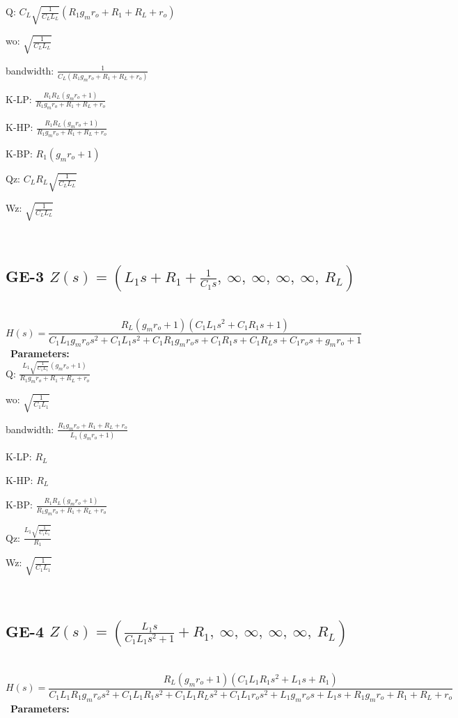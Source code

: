\documentclass{article}
\begin{document}
Q: $C_{L} \sqrt{\frac{1}{C_{L} L_{L}}} \left(R_{1} g_{m} r_{o} + R_{1} + R_{L} + r_{o}\right)$\ 

wo: $\sqrt{\frac{1}{C_{L} L_{L}}}$\ 

bandwidth: $\frac{1}{C_{L} \left(R_{1} g_{m} r_{o} + R_{1} + R_{L} + r_{o}\right)}$\ 

K-LP: $\frac{R_{1} R_{L} \left(g_{m} r_{o} + 1\right)}{R_{1} g_{m} r_{o} + R_{1} + R_{L} + r_{o}}$\ 

K-HP: $\frac{R_{1} R_{L} \left(g_{m} r_{o} + 1\right)}{R_{1} g_{m} r_{o} + R_{1} + R_{L} + r_{o}}$\ 

K-BP: $R_{1} \left(g_{m} r_{o} + 1\right)$\ 

Qz: $C_{L} R_{L} \sqrt{\frac{1}{C_{L} L_{L}}}$\ 

Wz: $\sqrt{\frac{1}{C_{L} L_{L}}}$\ 

\ 

\subsection{GE-3 $Z(s) = \left( L_{1} s + R_{1} + \frac{1}{C_{1} s}, \  \infty, \  \infty, \  \infty, \  \infty, \  R_{L}\right)$ } \ 
\textbf{\[H(s) = \frac{R_{L} \left(g_{m} r_{o} + 1\right) \left(C_{1} L_{1} s^{2} + C_{1} R_{1} s + 1\right)}{C_{1} L_{1} g_{m} r_{o} s^{2} + C_{1} L_{1} s^{2} + C_{1} R_{1} g_{m} r_{o} s + C_{1} R_{1} s + C_{1} R_{L} s + C_{1} r_{o} s + g_{m} r_{o} + 1}\] } \ 
\textbf{Parameters:}\\ 

Q: $\frac{L_{1} \sqrt{\frac{1}{C_{1} L_{1}}} \left(g_{m} r_{o} + 1\right)}{R_{1} g_{m} r_{o} + R_{1} + R_{L} + r_{o}}$\ 

wo: $\sqrt{\frac{1}{C_{1} L_{1}}}$\ 

bandwidth: $\frac{R_{1} g_{m} r_{o} + R_{1} + R_{L} + r_{o}}{L_{1} \left(g_{m} r_{o} + 1\right)}$\ 

K-LP: $R_{L}$\ 

K-HP: $R_{L}$\ 

K-BP: $\frac{R_{1} R_{L} \left(g_{m} r_{o} + 1\right)}{R_{1} g_{m} r_{o} + R_{1} + R_{L} + r_{o}}$\ 

Qz: $\frac{L_{1} \sqrt{\frac{1}{C_{1} L_{1}}}}{R_{1}}$\ 

Wz: $\sqrt{\frac{1}{C_{1} L_{1}}}$\ 

\ 

\subsection{GE-4 $Z(s) = \left( \frac{L_{1} s}{C_{1} L_{1} s^{2} + 1} + R_{1}, \  \infty, \  \infty, \  \infty, \  \infty, \  R_{L}\right)$ } \ 
\textbf{\[H(s) = \frac{R_{L} \left(g_{m} r_{o} + 1\right) \left(C_{1} L_{1} R_{1} s^{2} + L_{1} s + R_{1}\right)}{C_{1} L_{1} R_{1} g_{m} r_{o} s^{2} + C_{1} L_{1} R_{1} s^{2} + C_{1} L_{1} R_{L} s^{2} + C_{1} L_{1} r_{o} s^{2} + L_{1} g_{m} r_{o} s + L_{1} s + R_{1} g_{m} r_{o} + R_{1} + R_{L} + r_{o}}\] } \ 
\textbf{Parameters:}\\ 
\end{document}
